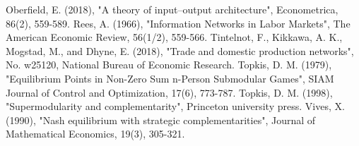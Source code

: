 \documentclass[12pt]{article}
\theoremstyle{definition}
\begin{document}
\begin{thebibliography}{99}
	Oberfield, E. (2018),
	"A theory of input–output architecture",
	Econometrica, 86(2), 559-589.
	Rees, A. (1966),
	"Information Networks in Labor Markets",
	The American Economic Review, 56(1/2), 559-566.
	Tintelnot, F., Kikkawa, A. K., Mogstad, M., and Dhyne, E. (2018),
	"Trade and domestic production networks",
	No. w25120, National Bureau of Economic Research.
	Topkis, D. M. (1979),
	"Equilibrium Points in Non-Zero Sum n-Person Submodular Games",
	SIAM Journal of Control and Optimization, 17(6), 773-787.
	Topkis, D. M. (1998),
	"Supermodularity and complementarity",
	Princeton university press.
	Vives, X. (1990),
	"Nash equilibrium with strategic complementarities",
	Journal of Mathematical Economics, 19(3), 305-321.
\end{thebibliography}
\end{document}
